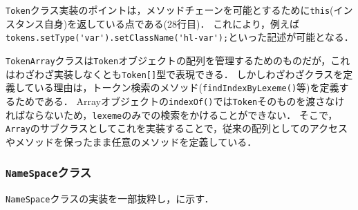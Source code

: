 \documentclass[autodetect-engine,dvi=dvipdfmx,ja=standard,
               a4j,11pt]{bxjsarticle}
\newcommand{\figref}[1]{\makebox{図~\ref{#1}}}
\begin{document}
\verb|Token|クラス実装のポイントは，メソッドチェーンを可能とするために\verb|this|(インスタンス自身)を返している点である(28行目)．
これにより，例えば\verb|tokens.setType('var').setClassName('hl-var');|といった記述が可能となる．

\verb|TokenArray|クラスは\verb|Token|オブジェクトの配列を管理するためのものだが，これはわざわざ実装しなくとも\verb|Token[]|型で表現できる．
しかしわざわざクラスを定義している理由は，トークン検索のメソッド(\verb|findIndexByLexeme()|等)を定義するためである．
Arrayオブジェクトの\verb|indexOf()|では\verb|Token|そのものを渡さなければならないため，\verb|lexeme|のみでの検索をかけることができない．
そこで，\verb|Array|のサブクラスとしてこれを実装することで，従来の配列としてのアクセスやメソッドを保ったまま任意のメソッドを定義している．

\subsubsection{{\tt NameSpace}クラス}

{\tt NameSpace}クラスの実装を一部抜粋し，\figref{prog:namespace}に示す．
\end{document}
